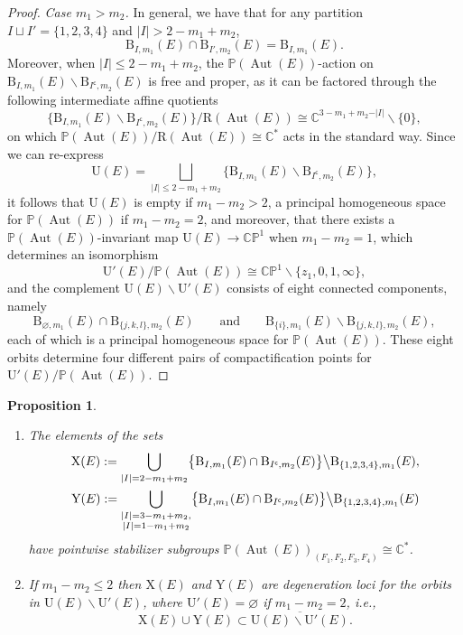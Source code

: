 \documentclass[10pt,a4paper]{amsart}
\newcommand{\field}[1]{\ensuremath{\mathbb{#1}}}
\newcommand{\CC}{\field{C}}
\newcommand{\PP}{\field{P}}
\DeclareMathOperator{\Aut}{Aut}
\numberwithin{equation}{section}
\newtheorem{Proposition}[Theorem]{Proposition}
 { \theoremstyle{definition}
\newtheorem{Definition}[Theorem]{Definition}
\newtheorem{Note}[Theorem]{Note}
\newtheorem{Example}[Theorem]{Example}
\newtheorem{Remark}[Theorem]{Remark} }
\begin{document}
\begin{proof}
\medskip\noindent\textit{Case $m_{1}>m_{2}$.}
In general, we have that for any partition $I\sqcup I' = \{1,2,3,4\}$ and $\vert I\vert > 2 - m_{1} + m_{2}$,
\[
\mathrm{B}_{I,m_{1}}(E)\cap\mathrm{B}_{I',m_{2}}(E) = \mathrm{B}_{I,m_{1}}(E).
\]
Moreover, when $\vert I\vert \leq 2 - m_{1} + m_{2}$, the $\PP(\Aut(E))$-action on $\mathrm{B}_{I,m_{1}}(E)\backslash \mathrm{B}_{I^{\mathsf{c}},m_{2}}(E)$ is free and proper, as it can be factored through the following intermediate affine quotients
\[
\bigl\{\mathrm{B}_{I,m_{1}}(E)\backslash\mathrm{B}_{I^{\mathsf{c}},m_{2}}(E)\bigr\}/\mathrm{R}(\Aut(E))\cong \CC^{3-m_{1}+m_{2}-\vert I\vert }\backslash\{0\},
\]
on which $\PP(\Aut (E))/\mathrm{R}(\Aut(E))\cong\CC^{*}$ acts in the standard way. Since we can re-express
\[
\mathrm{U}(E) = \bigsqcup_{\vert I\vert \leq 2-m_{1}+m_{2}}\bigl\{\mathrm{B}_{I,m_{1}}(E)\backslash\mathrm{B}_{I^{\mathsf{c}},m_{2}}(E)\bigr\},
\]
it follows that $\mathrm{U}(E)$ is empty if $m_{1}-m_{2}>2$, a principal homogeneous space for $\PP(\Aut(E))$ if $m_{1}-m_{2}=2$, and moreover, that there exists a $\PP(\Aut(E))$-invariant map $\mathrm{U}(E)\rightarrow \CC\PP^{1}$ when $m_{1}-m_{2}=1$, which determines an isomorphism
\[
\mathrm{U}'(E)/\PP(\Aut(E))\cong\CC\PP^{1}\backslash\{z_{1},0,1,\infty\},
\]
and the complement $\mathrm{U}(E)\backslash\mathrm{U}'(E)$ consists of eight connected components, namely
\[
\mathrm{B}_{\varnothing ,m_{1}}(E)\cap\mathrm{B}_{\{j,k,l\},m_{2}}(E)\qquad \text{and}\qquad \mathrm{B}_{\{i\},m_{1}}(E)\backslash\mathrm{B}_{\{j,k,l\},m_{2}}(E),
\]
each of which is a principal homogeneous space for $\PP(\Aut(E))$. These eight orbits determine four different pairs of compactification points for $\mathrm{U}'(E)/\PP(\Aut(E))$.
\end{proof}

\begin{Proposition}\label{prop:X-Y}\quad
\begin{enumerate}\itemsep=0pt
\item[$(i)$] The elements of the sets
\begin{gather*}
\mathrm{X}(E) :=
\displaystyle\bigcup_{\vert I\vert = 2 - m_{1}+m_{2}}\bigl\{\mathrm{B}_{I,m_{1}}(E)\cap\mathrm{B}_{I^{\mathsf{c}},m_{2}}(E)\bigr\} \big\backslash\mathrm{B}_{\{1,2,3,4\},m_{1}}(E),
\\
\mathrm{Y}(E) :=
\displaystyle\bigcup_{\substack{\vert I\vert = 3 - m_{1}+m_{2},\\\vert I\vert = 1 - m_{1}+m_{2}}}\bigl\{\mathrm{B}_{I,m_{1}}(E)\cap\mathrm{B}_{I^{\mathsf{c}},m_{2}}(E)\bigr\} \big\backslash\mathrm{B}_{\{1,2,3,4\},m_{1}}(E)
\end{gather*}
have pointwise stabilizer subgroups $\PP(\Aut(E))_{(F_{1},F_{2},F_{3},F_{4})}\cong \CC^{*}$.

\item[$(ii)$] If $m_{1}-m_{2} \leq 2$ then $\mathrm{X}(E)$ and $\mathrm{Y}(E)$ are degeneration loci for the orbits in $\mathrm{U}(E)\backslash \mathrm{U}'(E)$, where $\mathrm{U}'(E)=\varnothing $ if $m_{1}-m_{2}=2$, i.e.,
\[
\mathrm{X}(E)\cup \mathrm{Y}(E)\subset \overline{\mathrm{U}(E)\backslash\mathrm{U}'(E)}.
\]
\end{enumerate}
\end{Proposition}
\end{document}
